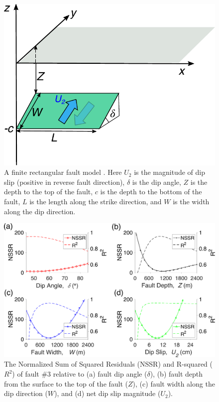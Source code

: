 \documentclass[draft,grl]{agutexSI2019}
\begin{document}
\begin{article}
\begin{figure}
\centering
\includegraphics[width=\textwidth]{figures/supplement/figureS6-fault-geom.pdf}
\caption{A finite rectangular fault model \cite{Okada1992}. Here $U_2$ is the magnitude of dip slip (positive in reverse fault direction), $\delta$ is the dip angle, $Z$ is the depth to the top of the fault, $c$ is the depth to the bottom of the fault, $L$ is the length along the strike direction, and $W$ is the width along the dip direction.}
\label{fig:model-fault-geom}
\end{figure}

\begin{figure}
\centering
\includegraphics[width=.98\textwidth]{figures/supplement/figureS7-fault-supplement-nssr.pdf}
\caption{The Normalized Sum of Squared Residuals (NSSR) and R-squared ($ R^2 $) of fault \#3 relative to (a) fault dip angle ($ \delta $), (b) fault depth from the surface to the top of the fault ($ Z $), (c) fault width along the dip direction ($ W $), and (d) net dip slip magnitude ($ U_2 $).}
\label{fig:fault-supplement-nssr}
\end{figure}


\end{article}
\end{document}
